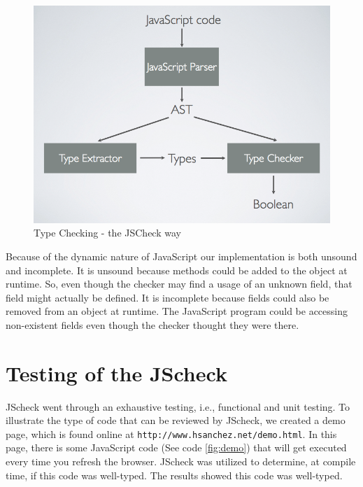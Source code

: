 \documentclass{article}
\begin{document}
\begin{figure}[here]
  \begin{center}
    \includegraphics[scale=0.4]{blockdiagram.png}
  \end{center}
  \caption{Type Checking - the JSCheck way}
  \label{fig:jscheckway}
\end{figure}
\pagebreak

Because of the dynamic nature of JavaScript our implementation is both unsound 
and incomplete. It is unsound because methods could be added to the object at
runtime. So, even though the checker may find a usage of an unknown field, that field
might actually be defined. It is incomplete because fields could also be removed
from an object at runtime. The JavaScript program could be accessing non-existent 
fields even though the checker thought they were there.


\section{Testing of the JScheck}
\label{sec:testing}

JScheck went through an exhaustive testing, i.e., functional and unit testing. 
To illustrate the type of code that can be reviewed by JScheck, we created a demo 
page, which is found online at {\tt http://www.hsanchez.net/demo.html}. In this page, 
there is some JavaScript code (See code \ref{fig:demo}) that will get executed every 
time you refresh the browser. JScheck was utilized to determine, at compile time, if 
this code was well-typed. The results showed this code was well-typed.
\end{document}
